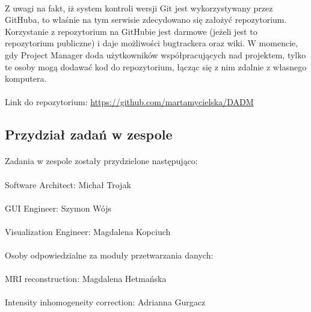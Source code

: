 \documentclass[12]{article}
\begin{document}
	\paragraph{}
	Z uwagi na fakt, iż system kontroli wersji Git jest wykorzystywany przez GitHuba, to właśnie na tym serwisie zdecydowano się założyć repozytorium. Korzystanie z repozytorium na GitHubie jest darmowe (jeżeli jest to repozytorium publiczne) i daje możliwości bugtrackera oraz wiki. W momencie, gdy Project Manager doda użytkowników współpracujących nad projektem, tylko te osoby mogą dodawać kod do repozytorium, łącząc się z nim zdalnie z własnego komputera.
	\paragraph{}
	Link do repozytorium: 
	\url{https://github.com/martamycielska/DADM}
	\subsection{Przydział zadań w zespole}
	\paragraph{}
	Zadania w zespole zostały przydzielone następująco:
	\paragraph{}
	Software Architect: Michał Trojak
	\paragraph{}
	GUI Engineer: Szymon Wójs
	\paragraph{}
	Visualization Engineer: Magdalena Kopciuch
	\paragraph{}
	Osoby odpowiedzialne za moduły przetwarzania danych:
	\paragraph{}
	MRI reconstruction: Magdalena Hetmańska
	\paragraph{}
	Intensity inhomogeneity correction: Adrianna Gurgacz
\end{document}
